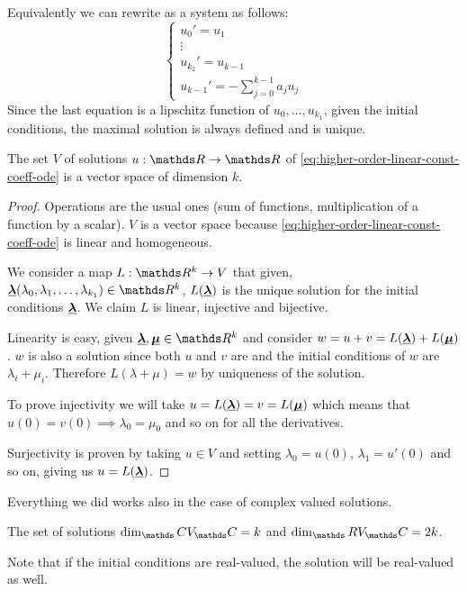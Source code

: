 \documentclass[12pt]{extarticle}
\renewcommand{\vec}[1]{\uvec{#1}}
\begin{document}
Equivalently we can rewrite as a system as follows:
\begin{equation}
    \begin{cases}
        u_0' = u_1         \\
        \vdots             \\
        u_{k_2}' = u_{k-1} \\
        u_{k-1}' = - \sum_{j = 0}^{k-1} a_j u_j
    \end{cases}
\end{equation}
Since the last equation is a lipschitz function of $u_0, \dots, u_{k_1}$, given the initial conditions, the maximal solution is always defined and is unique.

\begin{proposition}{}{}
    The set $V$ of solutions $u: \R \to \R$ of \cref{eq:higher-order-linear-const-coeff-ode} is a vector space of dimension $k$.
\end{proposition}

\begin{proof}
    Operations are the usual ones (sum of functions, multiplication of a function by a scalar).
    $V$ is a vector space because \cref{eq:higher-order-linear-const-coeff-ode} is linear and homogeneous.

    We consider a map $L: \R^k \to V$ that given, $\vec \lambda (\lambda_0, \lambda_1, \dots, \lambda_{k_1}) \in \R^k$, $L(\vec \lambda)$ is the unique solution for the initial conditions $\vec \lambda$.
    We claim $L$ is linear, injective and bijective.

    Linearity is easy, given $\vec \lambda, \vec \mu \in \R^k$ and consider $w = u + v = L(\vec \lambda) + L(\vec \mu)$.
    $w$ is also a solution since both $u$ and $v$ are and the initial conditions of $w$ are $\lambda_i + \mu_i$.
    Therefore $L(\lambda + \mu) = w$ by uniqueness of the solution.

    To prove injectivity we will take $u = L(\vec \lambda) = v = L (\vec \mu)$ which means that $u(0) = v(0) \implies \lambda_0 = \mu_0$ and so on for all the derivatives.

    Surjectivity is proven by taking $u \in V$ and setting $\lambda_0 = u(0)$, $\lambda_1 = u'(0)$ and so on, giving us $u = L(\vec \lambda)$.
\end{proof}

\begin{remark}{}{}
    Everything we did works also in the case of complex valued solutions.

    The set of solutions $\dim_\C V_\C = k$ and $\dim_\R V_\C = 2k$.

    Note that if the initial conditions are real-valued, the solution will be real-valued as well.
\end{remark}
\end{document}
